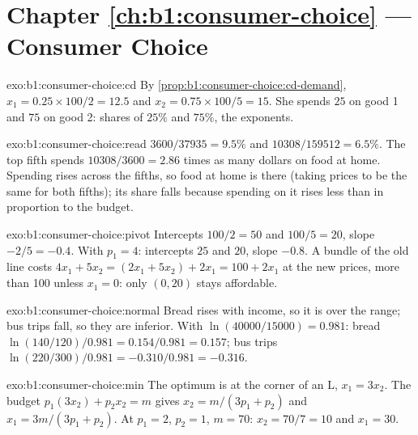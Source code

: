 \section*{Chapter \ref{ch:b1:consumer-choice} --- Consumer Choice}

\begin{solution}{exo:b1:consumer-choice:cd}
By \cref{prop:b1:consumer-choice:cd-demand}, $x_1 = 0.25 \times 100/2 = 12.5$
and $x_2 = 0.75 \times 100/5 = 15$. She spends $25$ on good 1 and $75$ on
good 2: shares of $25\%$ and $75\%$, the exponents.
\end{solution}

\begin{solution}{exo:b1:consumer-choice:read}
$3600/37935 = 9.5\%$ and $10308/159512 = 6.5\%$. The top fifth spends
$10308/3600 = 2.86$ times as many dollars on food at home. Spending rises
across the fifths, so food at home is  there (taking prices to be the
same for both fifths); its share falls because spending on it rises less
than in proportion to the budget.
\end{solution}

\begin{solution}{exo:b1:consumer-choice:pivot}
Intercepts $100/2 = 50$ and $100/5 = 20$, slope $-2/5 = -0.4$. With $p_1 = 4$:
intercepts $25$ and $20$, slope $-0.8$. A bundle of the old line costs
$4x_1 + 5x_2 = (2x_1 + 5x_2) + 2x_1 = 100 + 2x_1$ at the new prices, more than
100 unless $x_1 = 0$: only $(0, 20)$ stays affordable.
\end{solution}

\begin{solution}{exo:b1:consumer-choice:normal}
Bread rises with income, so it is  over the range; bus trips fall, so
they are inferior. With $\ln(40000/15000) = 0.981$: bread
$\ln(140/120)/0.981 = 0.154/0.981 = 0.157$; bus trips
$\ln(220/300)/0.981 = -0.310/0.981 = -0.316$.
\end{solution}

\begin{solution}{exo:b1:consumer-choice:min}
The optimum is at the corner of an L, $x_1 = 3x_2$. The budget
$p_1(3x_2) + p_2x_2 = m$ gives $x_2 = m/(3p_1 + p_2)$ and $x_1 = 3m/(3p_1 + p_2)$.
At $p_1 = 2$, $p_2 = 1$, $m = 70$: $x_2 = 70/7 = 10$ and $x_1 = 30$.
\end{solution}

